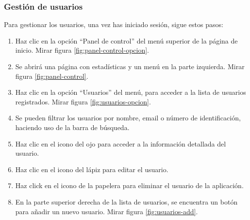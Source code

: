 \subsubsection{Gestión de usuarios}
Para gestionar los usuarios, una vez has iniciado sesión, sigue estos pasos:
\begin{enumerate}
	\item Haz clic en la opción “Panel de control” del menú superior de la página de inicio. Mirar figura \ref{fig:panel-control-opcion}.
	\item Se abrirá una página con estadísticas y un menú en la parte izquierda. Mirar figura \ref{fig:panel-control}.
	\item Haz clic en la opción “Usuarios” del menú, para acceder a la lista de usuarios registrados. Mirar figura \ref{fig:usuarios-opcion}.
	\item Se pueden filtrar los usuarios por nombre, email o número de identificación, haciendo uso de la barra de búsqueda.
	\item Haz clic en el icono del ojo para acceder a la información detallada del usuario.
	\item Haz clic en el icono del lápiz para editar el usuario.
	\item Haz click en el icono de la papelera para eliminar el usuario de la aplicación.
	\item En la parte superior derecha de la lista de usuarios, se encuentra un botón para añadir un nuevo usuario. Mirar figura \ref{fig:usuarios-add}.
\end{enumerate}

